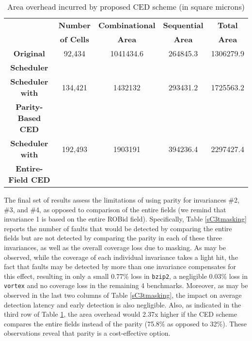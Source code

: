 \documentclass[12pt]{yalephd}
\newcommand{\snp}[1] {\noindent {\underline {#1}}}
\begin{document}
\begin{table}[!ht]
\caption{Area overhead incurred by proposed CED scheme (in square microns)}\label{sC3tarea_overhead}
\footnotesize
\begin{center}
\begin{tabular}{||c|c|c|c|c||}
\hline
\hline
 & {\bf Number} & {\bf Combinational} & {\bf Sequential} & {\bf Total}\\
 & {\bf of Cells} & {\bf Area} & {\bf Area} & {\bf Area}\\
\hline
{\bf Original} & 92,434 & 1041434.6 & 264845.3 & 1306279.9\\
{\bf Scheduler} & & & &\\
\hline
{\bf Scheduler with} & 134,421 & 1432132 & 293431.2 & 1725563.2\\
{\bf Parity-Based CED} & & & &\\
\hline
{\bf Scheduler with} & 192,493 & 1903191 & 394236.4 & 2297427.4\\
{\bf Entire-Field CED} & & & &\\
\hline
\hline
\end{tabular}
\end{center}
\end{table}

\snp{Masking due to parity:} The final set of results assess the limitations of using parity for invariances \#2, \#3, and \#4, as opposed to comparison of the entire fields (we remind that invariance 1 is based on the entire ROBid field). Specifically, Table \ref{sC3tmasking} reports the number of faults that would be detected by comparing the entire fields but are not detected by comparing the parity in each of these three invariances, as well as the overall coverage loss due to masking. As may be observed, while the coverage of each individual invariance takes a light hit, the fact that faults may be detected by more than one invariance compensates for this effect, resulting in only a small 0.77\% loss in {\tt bzip2}, a negligible 0.03\% loss in {\tt vortex} and no coverage loss in the remaining 4 benchmarks. Moreover, as may be observed in the last two columns of Table \ref{sC3tmasking}, the impact on average detection latency and early detection is also negligible. Also, as indicated in the third row of Table \ref{sC3tarea_overhead}, the area overhead would 2.37x higher if the CED scheme compares the entire fields instead of the parity (75.8\% as opposed to 32\%). These observations reveal that parity is a cost-effective option.
\end{document}
